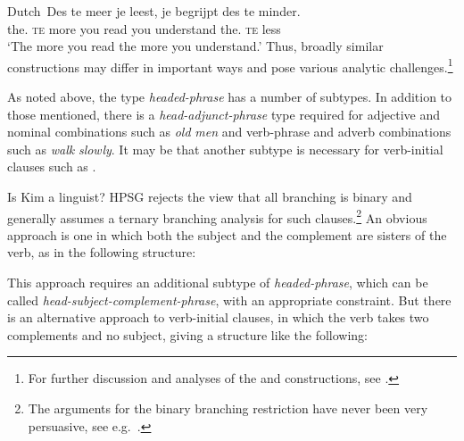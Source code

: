 \documentclass[output=paper]{langsci/langscibook}
\begin{document}
\ea\label{ex:key:4.20}Dutch\
    \sn\gll Des te meer je leest, je begrijpt des te minder.\\
            the.\Gen{} \textsc{te} more you read you understand the.\Gen{} \textsc{te} less\\
    \glt    \enquote*{The more you read the more you understand.}
\z
%
Thus, broadly similar constructions may differ in important ways and pose
various analytic challenges.\footnote{For further discussion and analyses of
the \ili{French} and \ili{Spanish} constructions, see
\textcite{AbeBorEsp2006,AbeBor2008}.}

As noted above, the type \emph{headed-phrase} has a number of subtypes. In
addition to those mentioned, there is a \emph{head-adjunct-phrase} type
required for adjective and nominal combinations such as \emph{old} \emph{men}
and verb-phrase and adverb combinations such as \emph{walk} \emph{slowly}. It
may be that another subtype is necessary for verb-initial clauses such as
\REF{ex:key:4.21}.

\ea\label{ex:key:4.21}
    Is Kim a linguist?
\z
%
\gls{HPSG} rejects the view that all branching is binary and generally assumes
a ternary branching analysis for such clauses.\footnote{The arguments for the
binary branching restriction have never been very persuasive, see e.g.\
\citet[112--116]{CulJac2005}.} An obvious approach is one in which both the
subject and the complement are sisters of the verb, as in the following
structure:

\ea\label{ex:key:4.22}
\z
%
This approach requires an additional subtype of \emph{headed-phrase}, which can
be called \emph{head-subject-complement-phrase}, with an appropriate
constraint. But there is an alternative approach to verb-initial clauses, in
which the verb takes two complements and no subject, giving a structure like
the following:
\end{document}

